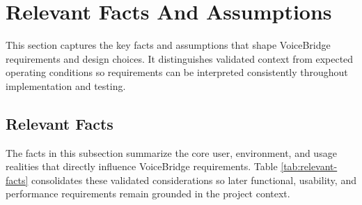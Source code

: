 \documentclass[11pt]{article}
\begin{document}
\section{Relevant Facts And Assumptions}
This section captures the key facts and assumptions that shape VoiceBridge requirements and design choices. It distinguishes validated context from expected operating conditions so requirements can be interpreted consistently throughout implementation and testing.

\subsection{Relevant Facts}
The facts in this subsection summarize the core user, environment, and usage realities that directly influence VoiceBridge requirements. Table \ref{tab:relevant-facts} consolidates these validated considerations so later functional, usability, and performance requirements remain grounded in the project context.
\end{document}
